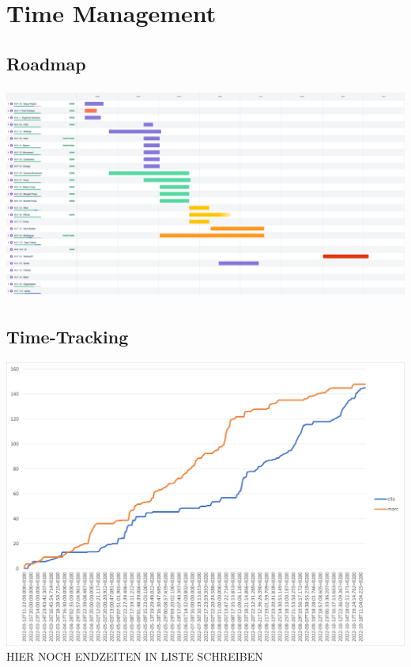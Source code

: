 \chapter{Time Management}

\section{Roadmap}
\includegraphics[height=7cm]{resources/Roadmap.png}\\

\section{Time-Tracking}
\includegraphics*[width=15cm]{resources/graph.png}
HIER NOCH ENDZEITEN IN LISTE SCHREIBEN